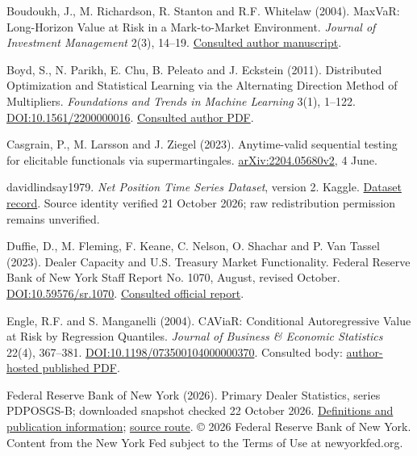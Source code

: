 \documentclass[10pt,a4paper]{article}
\begin{document}
Boudoukh, J., M. Richardson, R. Stanton and R.F. Whitelaw (2004). MaxVaR: Long-Horizon Value at Risk in a Mark-to-Market Environment. \emph{Journal of Investment Management} 2(3), 14–19. \href{https://pages.stern.nyu.edu/~rwhitela/papers/maxvar.pdf}{Consulted author manuscript}.

Boyd, S., N. Parikh, E. Chu, B. Peleato and J. Eckstein (2011). Distributed Optimization and Statistical Learning via the Alternating Direction Method of Multipliers. \emph{Foundations and Trends in Machine Learning} 3(1), 1–122. \href{https://doi.org/10.1561/2200000016}{DOI:10.1561/2200000016}. \href{https://web.stanford.edu/~boyd/papers/pdf/admm_distr_stats.pdf}{Consulted author PDF}.

Casgrain, P., M. Larsson and J. Ziegel (2023). Anytime-valid sequential testing for elicitable functionals via supermartingales. \href{https://arxiv.org/abs/2204.05680v2}{arXiv:2204.05680v2}, 4 June.

davidlindsay1979. \emph{Net Position Time Series Dataset}, version 2. Kaggle. \href{https://www.kaggle.com/datasets/davidlindsay1979/net-position-time-series-dataset}{Dataset record}. Source identity verified 21 October 2026; raw redistribution permission remains unverified.

Duffie, D., M. Fleming, F. Keane, C. Nelson, O. Shachar and P. Van Tassel (2023). Dealer Capacity and U.S. Treasury Market Functionality. Federal Reserve Bank of New York Staff Report No. 1070, August, revised October. \href{https://doi.org/10.59576/sr.1070}{DOI:10.59576/sr.1070}. \href{https://www.newyorkfed.org/medialibrary/media/research/staff_reports/sr1070.pdf}{Consulted official report}.

Engle, R.F. and S. Manganelli (2004). CAViaR: Conditional Autoregressive Value at Risk by Regression Quantiles. \emph{Journal of Business \& Economic Statistics} 22(4), 367–381. \href{https://doi.org/10.1198/073500104000000370}{DOI:10.1198/073500104000000370}. Consulted body: \href{https://www.simonemanganelli.org/Simone/Research_files/caviarPublished.pdf}{author-hosted published PDF}.

Federal Reserve Bank of New York (2026). Primary Dealer Statistics, series PDPOSGS-B; downloaded snapshot checked 22 October 2026. \href{https://www.newyorkfed.org/markets/counterparties/primary-dealers-statistics}{Definitions and publication information}; \href{https://markets.newyorkfed.org/api/pd/get/PDPOSGS-B.csv}{source route}. \copyright{} 2026 Federal Reserve Bank of New York. Content from the New York Fed subject to the Terms of Use at newyorkfed.org.
\end{document}
